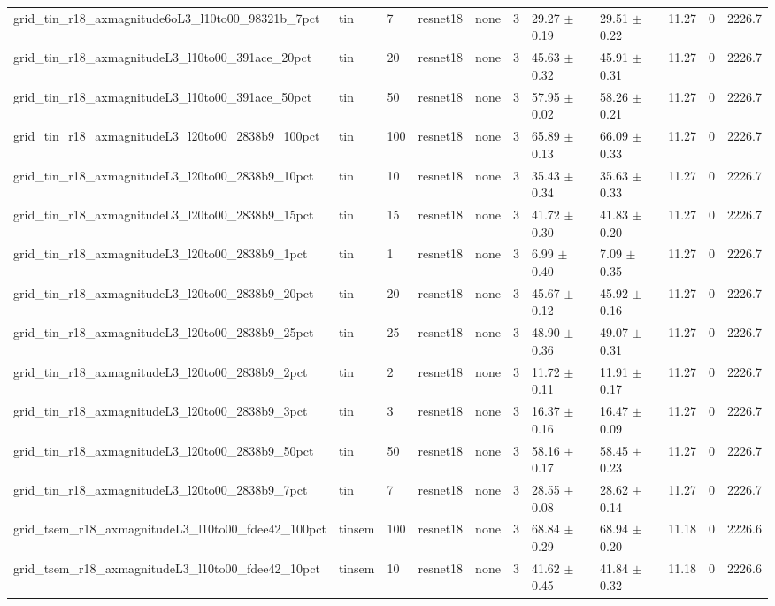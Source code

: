 \begin{tabular}{lllllllllll}
grid_tin_r18_axmagnitude6oL3_l10to00_98321b_7pct & tin & 7 & resnet18 & none & 3 & 29.27 $\pm$ 0.19 & 29.51 $\pm$ 0.22 & 11.27 & 0 & 2226.7 \\
grid_tin_r18_axmagnitudeL3_l10to00_391ace_20pct & tin & 20 & resnet18 & none & 3 & 45.63 $\pm$ 0.32 & 45.91 $\pm$ 0.31 & 11.27 & 0 & 2226.7 \\
grid_tin_r18_axmagnitudeL3_l10to00_391ace_50pct & tin & 50 & resnet18 & none & 3 & 57.95 $\pm$ 0.02 & 58.26 $\pm$ 0.21 & 11.27 & 0 & 2226.7 \\
grid_tin_r18_axmagnitudeL3_l20to00_2838b9_100pct & tin & 100 & resnet18 & none & 3 & 65.89 $\pm$ 0.13 & 66.09 $\pm$ 0.33 & 11.27 & 0 & 2226.7 \\
grid_tin_r18_axmagnitudeL3_l20to00_2838b9_10pct & tin & 10 & resnet18 & none & 3 & 35.43 $\pm$ 0.34 & 35.63 $\pm$ 0.33 & 11.27 & 0 & 2226.7 \\
grid_tin_r18_axmagnitudeL3_l20to00_2838b9_15pct & tin & 15 & resnet18 & none & 3 & 41.72 $\pm$ 0.30 & 41.83 $\pm$ 0.20 & 11.27 & 0 & 2226.7 \\
grid_tin_r18_axmagnitudeL3_l20to00_2838b9_1pct & tin & 1 & resnet18 & none & 3 & 6.99 $\pm$ 0.40 & 7.09 $\pm$ 0.35 & 11.27 & 0 & 2226.7 \\
grid_tin_r18_axmagnitudeL3_l20to00_2838b9_20pct & tin & 20 & resnet18 & none & 3 & 45.67 $\pm$ 0.12 & 45.92 $\pm$ 0.16 & 11.27 & 0 & 2226.7 \\
grid_tin_r18_axmagnitudeL3_l20to00_2838b9_25pct & tin & 25 & resnet18 & none & 3 & 48.90 $\pm$ 0.36 & 49.07 $\pm$ 0.31 & 11.27 & 0 & 2226.7 \\
grid_tin_r18_axmagnitudeL3_l20to00_2838b9_2pct & tin & 2 & resnet18 & none & 3 & 11.72 $\pm$ 0.11 & 11.91 $\pm$ 0.17 & 11.27 & 0 & 2226.7 \\
grid_tin_r18_axmagnitudeL3_l20to00_2838b9_3pct & tin & 3 & resnet18 & none & 3 & 16.37 $\pm$ 0.16 & 16.47 $\pm$ 0.09 & 11.27 & 0 & 2226.7 \\
grid_tin_r18_axmagnitudeL3_l20to00_2838b9_50pct & tin & 50 & resnet18 & none & 3 & 58.16 $\pm$ 0.17 & 58.45 $\pm$ 0.23 & 11.27 & 0 & 2226.7 \\
grid_tin_r18_axmagnitudeL3_l20to00_2838b9_7pct & tin & 7 & resnet18 & none & 3 & 28.55 $\pm$ 0.08 & 28.62 $\pm$ 0.14 & 11.27 & 0 & 2226.7 \\
grid_tsem_r18_axmagnitudeL3_l10to00_fdee42_100pct & tinsem & 100 & resnet18 & none & 3 & 68.84 $\pm$ 0.29 & 68.94 $\pm$ 0.20 & 11.18 & 0 & 2226.6 \\
grid_tsem_r18_axmagnitudeL3_l10to00_fdee42_10pct & tinsem & 10 & resnet18 & none & 3 & 41.62 $\pm$ 0.45 & 41.84 $\pm$ 0.32 & 11.18 & 0 & 2226.6 \\

\end{tabular}
